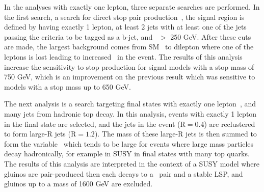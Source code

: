 In the analyses with exactly one lepton, three separate searches are performed.
In the first search, a search for direct stop pair production~\cite{1lstop2015}, the signal region is defined by having
exactly 1 lepton, at least 2 jets with at least one of the jets passing the criteria to be tagged as a b-jet, and \MET\ $>$ 250 GeV.
After these cuts are made, the largest background comes from SM \ttbar\ to dilepton where one of the leptons is lost leading to increased \MET\ in the event.
The results of this analysis increase the sensitivity to stop production for signal models with a stop mass of 750 GeV,
which is an improvement on the previous result which was sensitive to models with a stop mass up to 650 GeV.


The next analysis is a search targeting final states with exactly one lepton~\cite{1lmj2015}, and many jets from hadronic top decay.
In this analysis, events with exactly 1 lepton in the final state are selected,
and the jets in the event ($\mathrm{R=0.4}$) are reclustered to form large-R jets ($\mathrm{R=1.2}$).
The mass of these large-R jets is then summed to form the variable \MJ\
which tends to be large for events where large mass particles decay hadronically, for example in SUSY in final states with many top quarks.
The results of this analysis are interpreted in the context of a SUSY model where gluinos are pair-produced then each decays to a \ttbar\ pair and a stable LSP,
and gluinos up to a mass of 1600 GeV are excluded.



